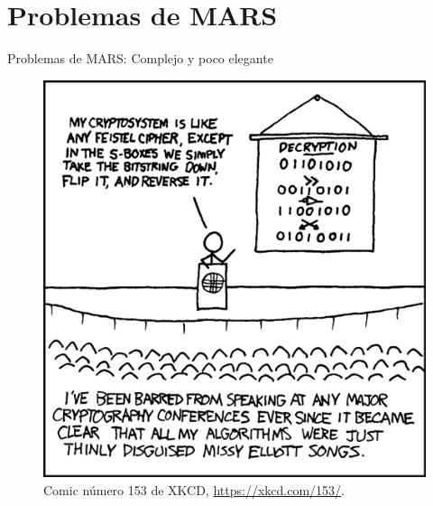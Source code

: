 \documentclass{beamer}
\begin{document}
\section{Problemas de MARS}
\begin{frame}{Problemas de MARS: Complejo y poco elegante}

	\begin{figure}[H]
		\centering
		\includegraphics[scale = 0.38]{xkcd_153.png}
		\caption{Comic número 153 de XKCD, \url{https://xkcd.com/153/}.} \label{fig:xkcd}
	\end{figure}

\end{frame}
\end{document}
